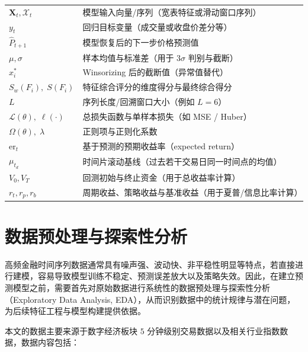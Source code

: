 \documentclass[withoutpreface,bwprint]{cumcmthesis}
\begin{document}
\begin{table}[!h]
\begin{tabular}{p{3cm}<{\centering}p{11cm}<{\centering}}
    $\mathbf{X}_t, \mathcal{X}_t$ & 模型输入向量/序列（宽表特征或滑动窗口序列）\\
    $y_t$ & 回归目标变量（成交量或收盘价差分等）\\
    $\hat{P}_{t+1}$ & 模型恢复后的下一步价格预测值\\
    $\mu, \sigma$ & 样本均值与标准差（用于 $3\sigma$ 判别与截断）\\
    $x_i^*$ & Winsorizing 后的截断值（异常值替代）\\
    $S_w(F_i),\; S(F_i)$ & 特征综合评分的维度得分与最终综合得分\\
    $L$ & 序列长度/回溯窗口大小（例如 $L=6$）\\
    $\mathcal{L}(\theta),\; \ell(\cdot)$ & 总损失函数与单样本损失（如 MSE / Huber）\\
    $\Omega(\theta),\; \lambda$ & 正则项与正则化系数\\
    $\text{er}_t$ & 基于预测的预期收益率（expected return）\\
    $\mu_{t_d}$ & 时间片滚动基线（过去若干交易日同一时间点的均值）\\
    $V_0, V_T$ & 回测初始与终止资金（用于总收益率计算）\\
    $r_t, r_p, r_b$ & 周期收益、策略收益与基准收益（用于夏普/信息比率计算）\\
    \bottomrule[1.5pt]
    \end{tabular}
\end{table}

\newpage
\section{数据预处理与探索性分析}

高频金融时间序列数据通常具有噪声强、波动快、非平稳性明显等特点，若直接进行建模，容易导致模型训练不稳定、预测误差放大以及策略失效。因此，在建立预测模型之前，需要首先对原始数据进行系统性的数据预处理与探索性分析（Exploratory Data Analysis, EDA），从而识别数据中的统计规律与潜在问题，为后续特征工程与模型构建提供依据。

本文的数据主要来源于数字经济板块 $5$ 分钟级别交易数据以及相关行业指数数据，数据内容包括：
\end{document}
